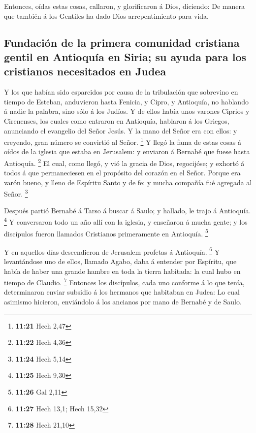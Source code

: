  Entonces, oídas estas cosas, callaron, y glorificaron á
Dios, diciendo: De manera que también á los Gentiles ha dado Dios
arrepentimiento para vida.

\hypertarget{fundaciuxf3n-de-la-primera-comunidad-cristiana-gentil-en-antioquuxeda-en-siria-su-ayuda-para-los-cristianos-necesitados-en-judea}{%
\subsection{Fundación de la primera comunidad cristiana gentil en
Antioquía en Siria; su ayuda para los cristianos necesitados en
Judea}\label{fundaciuxf3n-de-la-primera-comunidad-cristiana-gentil-en-antioquuxeda-en-siria-su-ayuda-para-los-cristianos-necesitados-en-judea}}

 Y los que habían sido esparcidos por causa de la
tribulación que sobrevino en tiempo de Esteban, anduvieron hasta
Fenicia, y Cipro, y Antioquía, no hablando á nadie la palabra, sino sólo
á los Judíos.  Y de ellos había unos varones Ciprios y
Cirenenses, los cuales como entraron en Antioquía, hablaron á los
Griegos, anunciando el evangelio del Señor Jesús.  Y la
mano del Señor era con ellos: y creyendo, gran número se convirtió al
Señor. \footnote{\textbf{11:21} Hech 2,47}  Y llegó la
fama de estas cosas á oídos de la iglesia que estaba en Jerusalem: y
enviaron á Bernabé que fuese hasta Antioquía. \footnote{\textbf{11:22}
  Hech 4,36}  El cual, como llegó, y vió la gracia de
Dios, regocijóse; y exhortó á todos á que permaneciesen en el propósito
del corazón en el Señor.  Porque era varón bueno, y lleno
de Espíritu Santo y de fe: y mucha compañía fué agregada al Señor.
\footnote{\textbf{11:24} Hech 5,14}

 Después partió Bernabé á Tarso á buscar á Saulo; y
hallado, le trajo á Antioquía. \footnote{\textbf{11:25} Hech 9,30}
 Y conversaron todo un año allí con la iglesia, y
enseñaron á mucha gente; y los discípulos fueron llamados Cristianos
primeramente en Antioquía. \footnote{\textbf{11:26} Gal 2,11}

 Y en aquellos días descendieron de Jerusalem profetas á
Antioquía. \footnote{\textbf{11:27} Hech 13,1; Hech 15,32}
 Y levantándose uno de ellos, llamado Agabo, daba á
entender por Espíritu, que había de haber una grande hambre en toda la
tierra habitada: la cual hubo en tiempo de Claudio. \footnote{\textbf{11:28}
  Hech 21,10}  Entonces los discípulos, cada uno conforme
á lo que tenía, determinaron enviar subsidio á los hermanos que
habitaban en Judea:  Lo cual asimismo hicieron,
enviándolo á los ancianos por mano de Bernabé y de Saulo.

